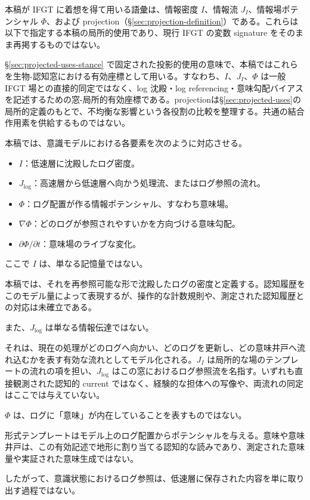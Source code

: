 本稿が IFGT に着想を得て用いる語彙は、情報密度 $I$、情報流 $J_I$、情報場ポテンシャル $\Phi$、および projection（§\ref{sec:projection-definition}）である。これらは以下で指定する本稿の局所的使用であり、現行 IFGT の変数 signature をそのまま再掲するものではない。

§\ref{sec:projected-uses-stance} で固定された投影的使用の意味で、本稿ではこれらを生物-認知窓における有効座標として用いる。すなわち、$I$、$J_I$、$\Phi$ は一般 IFGT 場との直接的同定ではなく、log 沈殿・log referencing・意味勾配バイアスを記述するための窓-局所的有効座標である。projectionは§\ref{sec:projected-uses}の局所的定義のもとで、不均衡な影響という各役割の比較を整理する。共通の結合作用素を供給するものではない。

本稿では、意識モデルにおける各要素を次のように対応させる。

\begin{itemize}
\item $I$：低速層に沈殿したログ密度。
\item $J_{\log}$：高速層から低速層へ向かう処理流、またはログ参照の流れ。
\item $\Phi$：ログ配置が作る情報ポテンシャル、すなわち意味場。
\item $\nabla \Phi$：どのログが参照されやすいかを方向づける意味勾配。
\item $\partial \Phi / \partial t$：意味場のライブな変化。
\end{itemize}

ここで $I$ は、単なる記憶量ではない。

本稿では、それを再参照可能な形で沈殿したログの密度と定義する。認知履歴をこのモデル量によって表現するが、操作的な計数規則や、測定された認知履歴との対応は未確立である。

また、$J_{\log}$ は単なる情報伝達ではない。

それは、現在の処理がどのログへ向かい、どのログを更新し、どの意味井戸へ流れ込むかを表す有効な流れとしてモデル化される。$J_I$ は局所的な場のテンプレートの流れの項を担い、$J_{\log}$ はこの窓におけるログ参照流を名指す。いずれも直接観測された認知的 current ではなく、経験的な担体への写像や、両流れの同定はここでは与えていない。

$\Phi$ は、ログに「意味」が内在していることを表すものではない。

形式テンプレートはモデル上のログ配置からポテンシャルを与える。意味や意味井戸は、この有効記述で地形に割り当てる認知的な読みであり、測定された意味量や実証された意味生成ではない。

したがって、意識状態におけるログ参照は、低速層に保存された内容を単に取り出す過程ではない。

